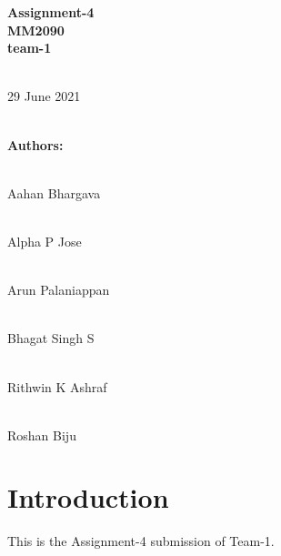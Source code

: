 \documentclass[a4paper, 12pt]{article}
\begin{document}
\begin{center}
 \huge{\textbf{Assignment-4}}
 \vspace{1cm}
 \\\huge{\textbf{MM2090}}
 \vspace{1cm}
 \\\huge{\textbf{team-1}}
 
 \vspace{1cm}
 
 \\29 June 2021
 
 \vspace{3cm}
 
 \\\textbf{\LARGE{Authors:}}
 
 \vspace{0.5cm}
 \\\LARGE{Aahan Bhargava {\selectfont [ME20B001]}}

 \vspace{0.5cm}
 \\\LARGE{Alpha P Jose {\selectfont [ME20B021]}}

 \vspace{0.5cm}
 \\\LARGE{Arun Palaniappan {\selectfont [ME20B036]}}

 \vspace{0.5cm}
 \\\LARGE{Bhagat Singh S {\selectfont [MM20B011]}}

 \vspace{0.5cm}
 \\\LARGE{Rithwin K Ashraf {\selectfont [ME20B150]}}

 \vspace{0.5cm}
 \\\LARGE{Roshan Biju {\selectfont [MM20B052]}}

\end{center}
\newpage

\tableofcontents

\vspace{3cm}

\section{Introduction}

This is the Assignment-4 submission of Team-1.
\newpage



\newpage

\newpage

\newpage

\newpage

\newpage




\newpage


\end{document}
